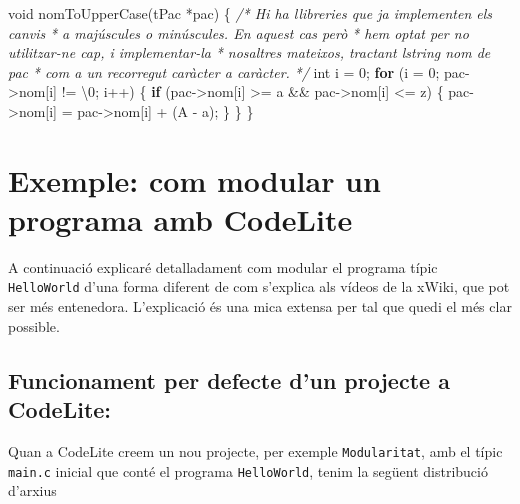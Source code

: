 \documentclass[
]{book}
\newenvironment{Shaded}{\begin{snugshade}}{\end{snugshade}}
\newcommand{\CharTok}[1]{\textcolor[rgb]{0.31,0.60,0.02}{#1}}
\newcommand{\CommentTok}[1]{\textcolor[rgb]{0.56,0.35,0.01}{\textit{#1}}}
\newcommand{\ControlFlowTok}[1]{\textcolor[rgb]{0.13,0.29,0.53}{\textbf{#1}}}
\newcommand{\DataTypeTok}[1]{\textcolor[rgb]{0.13,0.29,0.53}{#1}}
\newcommand{\DecValTok}[1]{\textcolor[rgb]{0.00,0.00,0.81}{#1}}
\newcommand{\NormalTok}[1]{#1}
\begin{document}
\begin{Shaded}
\begin{Highlighting}[]
\DataTypeTok{void}\NormalTok{ nomToUpperCase(tPac *pac) \{}
    \CommentTok{/* Hi ha llibreries que ja implementen els canvis}
\CommentTok{     * a majúscules o minúscules. En aquest cas però}
\CommentTok{     * hem optat per no utilitzar{-}ne cap, i implementar{-}la}
\CommentTok{     * nosaltres mateixos, tractant l\textquotesingle{}string nom de pac}
\CommentTok{     * com a un recorregut caràcter a caràcter.}
\CommentTok{     */}
    \DataTypeTok{int}\NormalTok{ i = }\DecValTok{0}\NormalTok{;}
    \ControlFlowTok{for}\NormalTok{ (i = }\DecValTok{0}\NormalTok{; pac{-}\textgreater{}nom[i] != }\CharTok{\textquotesingle{}\textbackslash{}0\textquotesingle{}}\NormalTok{; i++) \{}
        \ControlFlowTok{if}\NormalTok{ (pac{-}\textgreater{}nom[i] \textgreater{}= }\CharTok{\textquotesingle{}a\textquotesingle{}}\NormalTok{ \&\& pac{-}\textgreater{}nom[i] \textless{}= }\CharTok{\textquotesingle{}z\textquotesingle{}}\NormalTok{) \{}
\NormalTok{            pac{-}\textgreater{}nom[i] = pac{-}\textgreater{}nom[i] + (}\CharTok{\textquotesingle{}A\textquotesingle{}}\NormalTok{ {-} }\CharTok{\textquotesingle{}a\textquotesingle{}}\NormalTok{);}
\NormalTok{        \}}
\NormalTok{    \}}
\NormalTok{\}}
\end{Highlighting}
\end{Shaded}

\hypertarget{exemple-com-modular-un-programa-amb-codelite}{%
\section{Exemple: com modular un programa amb CodeLite}\label{exemple-com-modular-un-programa-amb-codelite}}

A continuació explicaré detalladament com modular el programa típic \texttt{HelloWorld} d'una forma diferent de com s'explica als vídeos de la xWiki, que pot ser més entenedora. L'explicació és una mica extensa per tal que quedi el més clar possible.

\hypertarget{funcionament-per-defecte-dun-projecte-a-codelite}{%
\subsection{Funcionament per defecte d'un projecte a CodeLite:}\label{funcionament-per-defecte-dun-projecte-a-codelite}}

Quan a CodeLite creem un nou projecte, per exemple \texttt{Modularitat}, amb el típic \texttt{main.c} inicial que conté el programa \texttt{HelloWorld}, tenim la següent distribució d'arxius
\end{document}
